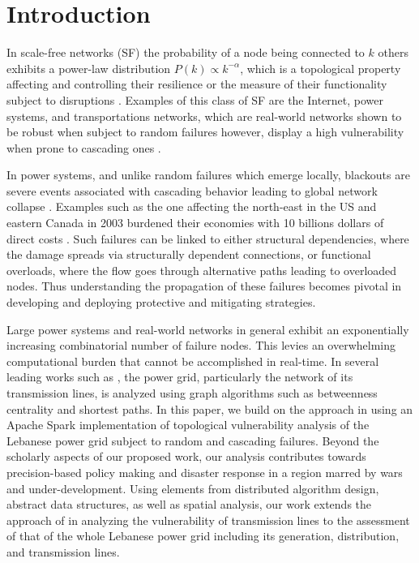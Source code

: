 \section{Introduction}
\label{introduction}

In scale-free networks (SF) the probability of a node being connected to $k$ others exhibits a power-law distribution $P(k) \propto k^{-\alpha}$, which is a topological property affecting and controlling their resilience or the measure of their functionality subject to disruptions \cite{Newman:2003da,Gao:2015fg,Bashan:2013cja,Gao:2015fga,2000Natur.406..378A}. Examples of this class of SF are the Internet, power systems, and transportations networks, which are real-world networks shown to be robust when subject to random failures however, display a high vulnerability when prone to cascading ones \cite{Bompard:2011cd,DuenasOsorio:2009ff,2016arXiv160904310M,Cohen:2001hf}. 

In power systems, and unlike random failures which emerge locally, blackouts are severe events  associated with cascading behavior leading to global network collapse \cite{RosasCasals:2007td,Bompard:2009ga,Brummitt:2013jj,Daqing:2014bp,Albert:2004bw,Wang:2011js,Sole:2008cv}.
Examples such as the one affecting the north-east in the US and eastern Canada in 2003 burdened their economies with 10 billions dollars of direct costs \cite{Daqing:2014bp}. Such failures can be linked to either structural dependencies, where the damage spreads via structurally dependent connections, or functional overloads, where the flow goes through alternative paths leading to overloaded nodes. Thus understanding the propagation of these failures becomes pivotal in developing and deploying protective and mitigating strategies. 

Large power systems and real-world networks in general exhibit an exponentially increasing combinatorial number of failure nodes. This levies an overwhelming computational burden that cannot be accomplished in real-time. In several leading works such as \cite{2000Natur.406..378A,JinAl10, DaqingAl14}, the power grid, particularly the network of its transmission lines, is analyzed using graph algorithms such as betweenness centrality and shortest paths. In this paper, we build on the approach in  \cite{2000Natur.406..378A} using an Apache Spark implementation of topological vulnerability analysis of the Lebanese power grid subject to random  and cascading failures. Beyond the scholarly aspects of our proposed work, our analysis contributes towards precision-based policy making and disaster response in a region marred by wars and under-development. 
Using elements from distributed algorithm design, abstract data structures, as well as spatial analysis, our work extends the approach of \cite{2000Natur.406..378A} in analyzing the vulnerability of transmission lines to the assessment of that of the whole Lebanese power grid including its generation, distribution, and transmission lines. 

